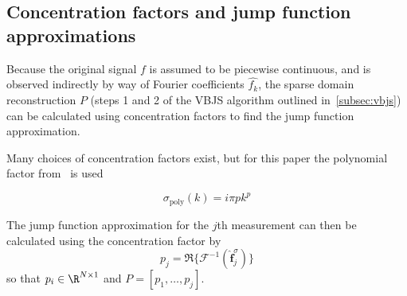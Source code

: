 \documentclass{article}
\begin{document}
%

\subsection{Concentration factors and jump function approximations}

Because the original signal $f$ is assumed to be piecewise continuous, and is observed indirectly by way of Fourier coefficients $\hat{f_k}$, the sparse domain reconstruction $P$ (steps 1 and 2 of the VBJS algorithm outlined in~\ref{subsec:vbjs}) can be calculated using concentration factors to find the jump function approximation.

Many choices of concentration factors exist, but for this paper the polynomial factor from~\cite{Gelb2011} is used

\begin{equation}\label{eq:conc_factor}
    \sigma_\text{poly}(k) = i\pi pk^p
\end{equation}


The jump function approximation for the $j$th measurement can then be calculated using the concentration factor by
\[
p_j = \Re\{ \mathcal{F}^{-1}(\hat{\mathbf{f}}^\sigma_j) \}
\]
so that $p_i \in \R^{N \times 1}$ and $P = [p_1, \dots, p_j]$.
\end{document}
